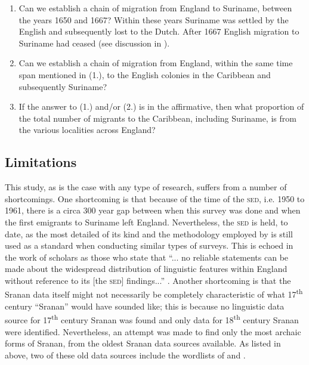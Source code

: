 \begin{enumerate}
\item{ Can we establish a chain of migration from England to Suriname, between the years 1650 and 1667? Within these years Suriname was settled by the English and subsequently lost to the Dutch. After 1667 English migration to Suriname had ceased (see discussion in ).}
\item{Can we establish a chain of migration from England, within the same time span mentioned in (1.), to the English colonies in the Caribbean and subsequently Suriname?}
\item{If the answer to (1.) and/or (2.) is in the affirmative, then what proportion of the total number of migrants to the Caribbean, including Suriname, is from the various localities across England?}
\end{enumerate}


\subsection{Limitations}
This study, as is the case with any type of research, suffers from a number of shortcomings. One shortcoming is that because of the time of the \textsc{sed}, i.e. 1950 to 1961, there is a circa 300 year gap between when this survey was done and when the first emigrants to Suriname left England. Nevertheless, the \textsc{sed} is held, to date, as the most detailed of its kind and the methodology employed by \citet{Orton6271} is still used as a standard when conducting similar types of surveys. This is echoed in the work of scholars as those who state that ``... no reliable statements can be made about the widespread distribution of linguistic features within England without reference to its [the \textsc{sed}] findings...'' \citep[29]{Kortmann04}. Another shortcoming is that the Sranan data itself might not necessarily be completely characteristic of what 17\textsuperscript{th} century ``Sranan'' would have sounded like; this is because no linguistic data source for 17\textsuperscript{th} century Sranan was found and only data for 18\textsuperscript{th} century Sranan were identified. Nevertheless, an attempt was made to find only the most archaic forms of Sranan, from the oldest Sranan data sources available. As listed in  above, two of these old data sources include the wordlists of \citet{Herlein18} and  \citet{Schumann83}.

